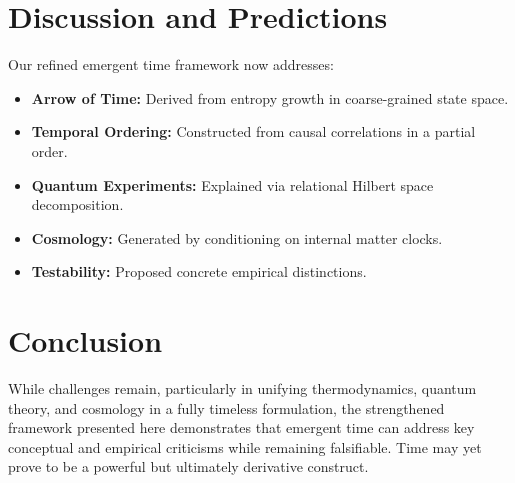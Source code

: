 \documentclass[12pt]{article}
\begin{document}
\section{Discussion and Predictions}
Our refined emergent time framework now addresses:
\begin{itemize}
    \item \textbf{Arrow of Time:} Derived from entropy growth in coarse-grained state space.
    \item \textbf{Temporal Ordering:} Constructed from causal correlations in a partial order.
    \item \textbf{Quantum Experiments:} Explained via relational Hilbert space decomposition.
    \item \textbf{Cosmology:} Generated by conditioning on internal matter clocks.
    \item \textbf{Testability:} Proposed concrete empirical distinctions.
\end{itemize}

\section{Conclusion}
While challenges remain, particularly in unifying thermodynamics, quantum theory, and cosmology in a fully timeless formulation, the strengthened framework presented here demonstrates that emergent time can address key conceptual and empirical criticisms while remaining falsifiable. Time may yet prove to be a powerful but ultimately derivative construct.
\end{document}
